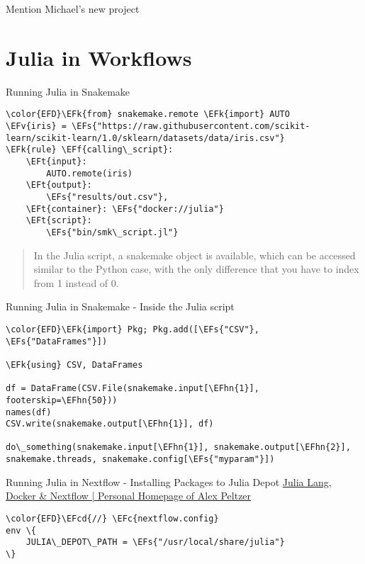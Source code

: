 \documentclass[bigger]{beamer}
\newcommand{\EFc}[1]{\textcolor{EFc}{#1}} %
\newcommand{\EFcd}[1]{\textcolor{EFcd}{#1}} %
\newcommand{\EFs}[1]{\textcolor{EFs}{#1}} %
\newcommand{\EFk}[1]{\textcolor{EFk}{#1}} %
\newcommand{\EFf}[1]{\textcolor{EFf}{#1}} %
\newcommand{\EFv}[1]{\textcolor{EFv}{#1}} %
\newcommand{\EFt}[1]{\textcolor{EFt}{#1}} %
\newcommand{\EFhn}[1]{\textcolor{EFhn}{\textbf{#1}}} %
\begin{document}
\begin{frame}[label={sec:org0f64977}]{Mention Michael's new project}
\end{frame}
\section*{Julia in Workflows}
\label{sec:orgce3f249}
\begin{frame}[label={sec:orgae48e4c},fragile]{Running Julia in Snakemake}
 \begin{Code}
\begin{Verbatim}
\color{EFD}\EFk{from} snakemake.remote \EFk{import} AUTO
\EFv{iris} = \EFs{"https://raw.githubusercontent.com/scikit-learn/scikit-learn/1.0/sklearn/datasets/data/iris.csv"}
\EFk{rule} \EFf{calling\_script}:
    \EFt{input}:
        AUTO.remote(iris)
    \EFt{output}:
        \EFs{"results/out.csv"},
    \EFt{container}: \EFs{"docker://julia"}
    \EFt{script}:
        \EFs{"bin/smk\_script.jl"}
\end{Verbatim}
\end{Code}

\small
\begin{quote}
In the Julia script, a snakemake object is available, which can be accessed
similar to the Python case, with the only difference that you have to index from
1 instead of 0.
\end{quote}
\end{frame}

\begin{frame}[label={sec:org6a84d8a},fragile]{Running Julia in Snakemake - Inside the Julia script}
 \begin{Code}
\begin{Verbatim}
\color{EFD}\EFk{import} Pkg; Pkg.add([\EFs{"CSV"}, \EFs{"DataFrames"}])

\EFk{using} CSV, DataFrames

df = DataFrame(CSV.File(snakemake.input[\EFhn{1}], footerskip=\EFhn{50}))
names(df)
CSV.write(snakemake.output[\EFhn{1}], df)

do\_something(snakemake.input[\EFhn{1}], snakemake.output[\EFhn{2}], snakemake.threads, snakemake.config[\EFs{"myparam"}])
\end{Verbatim}
\end{Code}
\end{frame}

\begin{frame}[label={sec:org8fcd6f2},fragile]{Running Julia in Nextflow - Installing Packages to Julia Depot}
 \href{https://apeltzer.github.io/post/03-julia-lang-nextflow/}{Julia Lang, Docker \& Nextflow | Personal Homepage of Alex Peltzer}

\begin{Code}
\begin{Verbatim}
\color{EFD}\EFcd{//} \EFc{nextflow.config}
env \{
    JULIA\_DEPOT\_PATH = \EFs{"/usr/local/share/julia"}
\}
\end{Verbatim}
\end{Code}
\end{frame}
\end{document}
